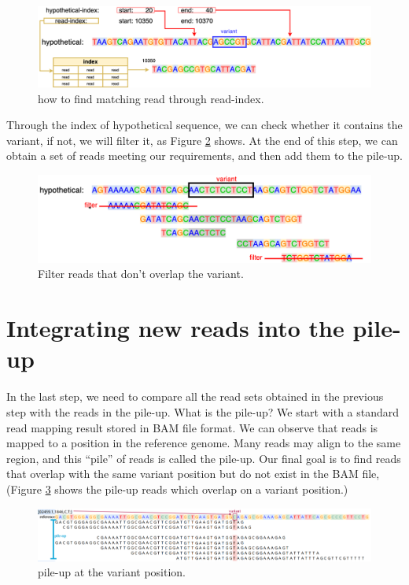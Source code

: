 \begin{figure}[H]
\vspace{1em}
\includegraphics[width=1\columnwidth]{body/image/read-index.png}
\caption[read-index]{how to find matching read through read-index.}
\label{read-index}
\end{figure}

Through the index of hypothetical sequence, we can check whether it contains the variant, if not, we will filter it, as Figure \ref{filter-reads} shows.  At the end of this step, we can obtain a set of reads meeting our requirements, and then add them to the pile-up.

\begin{figure}[H]
\includegraphics[width=1\columnwidth]{body/image/filter-reads.png}
\caption[Filter reads]{Filter reads that don't overlap the variant.}
\label{filter-reads}
\end{figure}

\section{Integrating new reads into the pile-up}
In the last step, we need to compare all the read sets obtained in the previous step with the reads in the pile-up. What is the pile-up?
We start with a standard read mapping result stored in BAM file format.  We can observe that reads is mapped to a position in the reference genome. Many reads may align to the same region, and this ``pile'' of reads is called the pile-up. Our final goal is to find reads that overlap with the same variant position but do not exist in the BAM file, (Figure \ref{exp-pile-up} shows the pile-up reads which overlap on a variant position.)

\begin{figure}[H]
\vspace*{1em}
\includegraphics[width=1\columnwidth]{body/image/exp-pileup.png}
\caption[pile-up]{pile-up at the variant position.}
\label{exp-pile-up}
\end{figure}

